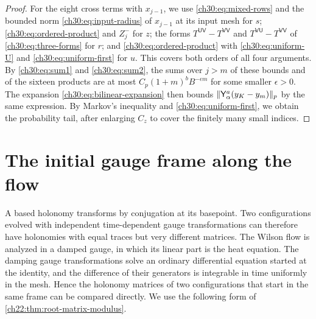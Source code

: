 \begin{proof}
For the eight cross terms with $x_{j-1}$, we use \eqref{ch30:eq:mixed-rows} and the bounded norm \eqref{ch30:eq:input-radius} of $x_{j-1}$ at its input mesh for $s$; \eqref{ch30:eq:ordered-product} and $Z_j^-$ for $z$; the forms $T^{\mathsf{UV}}-T^{\mathsf{VV}}$ and $T^{\mathsf{VU}}-T^{\mathsf{VV}}$ of \eqref{ch30:eq:three-forms} for $r$; and \eqref{ch30:eq:ordered-product} with \eqref{ch30:eq:uniform-U} and \eqref{ch30:eq:uniform-first} for $u$. This covers both orders of all four arguments. By \eqref{ch30:eq:sum1} and \eqref{ch30:eq:sum2}, the sums over $j>m$ of these bounds and of the sixteen products are at most $C_p(1+m)^bB^{-\epsilon m}$ for some smaller $\epsilon>0$. The expansion \eqref{ch30:eq:bilinear-expansion} then bounds $\lVert \mathsf Y_\alpha^a(y_K-y_m)\rVert_p$ by the same expression. By Markov's inequality and \eqref{ch30:eq:uniform-first}, we obtain the probability tail, after enlarging $C_z$ to cover the finitely many small indices.
\end{proof}

\section{The initial gauge frame along the flow}\label{ch30:sec:frame}

A based holonomy transforms by conjugation at its basepoint. Two configurations evolved with independent time-dependent gauge transformations can therefore have holonomies with equal traces but very different matrices. The Wilson flow is analyzed in a damped gauge, in which its linear part is the heat equation. The damping gauge transformations solve an ordinary differential equation started at the identity, and the difference of their generators is integrable in time uniformly in the mesh. Hence the holonomy matrices of two configurations that start in the same frame can be compared directly. We use the following form of \cref{ch22:thm:root-matrix-modulus}.

